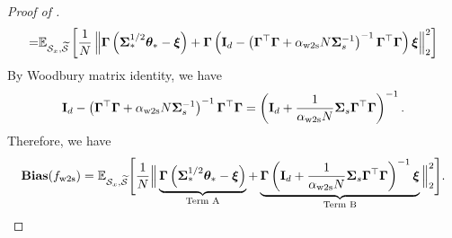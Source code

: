 \begin{proof}[Proof of ]
\begin{align*}
        = &\E_{\Scal_x, \wt\Scal}\sbr{\frac{1}{N} \nbr{\Gammab \rbr{\Sigmab_*^{1/2} \thetab_* - \xib} + \Gammab \rbr{\Ib_d - \rbr{\Gammab^\top \Gammab + \alpha_\wts N \Sigmab_s^{-1}}^{-1} \Gammab^\top \Gammab} \xib}_2^2} \\
    \end{align*} 
    By Woodbury matrix identity, we have
    \begin{align}\label{eq:pf_ridge_bias_woodbury}
        \Ib_d - \rbr{\Gammab^\top \Gammab + \alpha_\wts N \Sigmab_s^{-1}}^{-1} \Gammab^\top \Gammab
        = \rbr{\Ib_d + \frac{1}{\alpha_\wts N} \Sigmab_s \Gammab^\top \Gammab}^{-1}.
    \end{align}
    Therefore, we have 
    \begin{align}\label{eq:pf_ridge_bias_inter1}
        \bias(f_\wts) = \E_{\Scal_x, \wt\Scal}\Bigg[\frac{1}{N} \Big\|\underbrace{\Gammab \rbr{\Sigmab_*^{1/2} \thetab_* - \xib}}_{\t{Term A}} + \underbrace{\Gammab \rbr{\Ib_d + \frac{1}{\alpha_\wts N} \Sigmab_s \Gammab^\top \Gammab}^{-1} \xib}_{\t{Term B}}\Big\|_2^2\Bigg].
    \end{align}


\end{proof}
